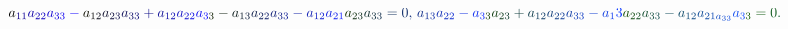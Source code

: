 \documentclass[12pt]{article}
\begin{document}
\begin{displaymath}
{a} _ { \mathcolor[RGB]{15,0,135}{1} \mathcolor[RGB]{15,0,150}{1} } \mathcolor[RGB]{15,0,165}{a} _ { \mathcolor[RGB]{15,0,180}{2} \mathcolor[RGB]{15,0,195}{2} } \mathcolor[RGB]{15,0,210}{a} _ { \mathcolor[RGB]{15,0,225}{3} \mathcolor[RGB]{15,0,240}{3} } \mathcolor[RGB]{15,0,255}{-} \mathcolor[RGB]{15,15,0}{a} _ { \mathcolor[RGB]{15,15,15}{1} \mathcolor[RGB]{15,15,30}{2} } \mathcolor[RGB]{15,15,45}{a} _ { \mathcolor[RGB]{15,15,60}{2} \mathcolor[RGB]{15,15,75}{3} } \mathcolor[RGB]{15,15,90}{a} _ { \mathcolor[RGB]{15,15,105}{3} \mathcolor[RGB]{15,15,120}{3} } \mathcolor[RGB]{15,15,135}{+} \mathcolor[RGB]{15,15,150}{a} _ { \mathcolor[RGB]{15,15,165}{1} \mathcolor[RGB]{15,15,180}{2} } \mathcolor[RGB]{15,15,195}{a} _ { \mathcolor[RGB]{15,15,210}{2} \mathcolor[RGB]{15,15,225}{2} } \mathcolor[RGB]{15,15,240}{a} _ { \mathcolor[RGB]{15,15,255}{3} \mathcolor[RGB]{15,30,0}{3} } \mathcolor[RGB]{15,30,15}{-} \mathcolor[RGB]{15,30,30}{a} _ { \mathcolor[RGB]{15,30,45}{1} \mathcolor[RGB]{15,30,60}{3} } \mathcolor[RGB]{15,30,75}{a} _ { \mathcolor[RGB]{15,30,90}{2} \mathcolor[RGB]{15,30,105}{2} } \mathcolor[RGB]{15,30,120}{a} _ { \mathcolor[RGB]{15,30,135}{3} \mathcolor[RGB]{15,30,150}{3} } \mathcolor[RGB]{15,30,165}{-} \mathcolor[RGB]{15,30,180}{a} _ { \mathcolor[RGB]{15,30,195}{1} \mathcolor[RGB]{15,30,210}{2} } \mathcolor[RGB]{15,30,225}{a} _ { \mathcolor[RGB]{15,30,240}{2} \mathcolor[RGB]{15,30,255}{1} } \mathcolor[RGB]{15,45,0}{a} _ { \mathcolor[RGB]{15,45,15}{2} \mathcolor[RGB]{15,45,30}{3} } \mathcolor[RGB]{15,45,45}{a} _ { \mathcolor[RGB]{15,45,60}{3} \mathcolor[RGB]{15,45,75}{3} } \mathcolor[RGB]{15,45,90}{=} \mathcolor[RGB]{15,45,105}{0} \mathcolor[RGB]{15,45,120}{,} \mathcolor[RGB]{15,45,135}{\,
a} _ { \mathcolor[RGB]{15,45,150}{1} \mathcolor[RGB]{15,45,165}{3} } \mathcolor[RGB]{15,45,180}{a} _ { \mathcolor[RGB]{15,45,195}{2} \mathcolor[RGB]{15,45,210}{2} } \mathcolor[RGB]{15,45,225}{-} \mathcolor[RGB]{15,45,240}{a} _ { \mathcolor[RGB]{15,45,255}{3} \mathcolor[RGB]{15,60,0}{3} } \mathcolor[RGB]{15,60,15}{a} _ { \mathcolor[RGB]{15,60,30}{2} \mathcolor[RGB]{15,60,45}{3} } \mathcolor[RGB]{15,60,60}{+} \mathcolor[RGB]{15,60,75}{a} _ { \mathcolor[RGB]{15,60,90}{1} \mathcolor[RGB]{15,60,105}{2} } \mathcolor[RGB]{15,60,120}{a} _ { \mathcolor[RGB]{15,60,135}{2} \mathcolor[RGB]{15,60,150}{2} } \mathcolor[RGB]{15,60,165}{a} _ { \mathcolor[RGB]{15,60,180}{3} \mathcolor[RGB]{15,60,195}{3} } \mathcolor[RGB]{15,60,210}{-} \mathcolor[RGB]{15,60,225}{a} _ { \mathcolor[RGB]{15,60,240}{1} } \mathcolor[RGB]{15,60,255}{3} \mathcolor[RGB]{15,75,0}{a} _ { \mathcolor[RGB]{15,75,15}{2} \mathcolor[RGB]{15,75,30}{2} } \mathcolor[RGB]{15,75,45}{a} _ { \mathcolor[RGB]{15,75,60}{3} \mathcolor[RGB]{15,75,75}{3} } \mathcolor[RGB]{15,75,90}{-} \mathcolor[RGB]{15,75,105}{a} _ { \mathcolor[RGB]{15,75,120}{1} \mathcolor[RGB]{15,75,135}{2} } \mathcolor[RGB]{15,75,150}{a} _ { \mathcolor[RGB]{15,75,165}{2} \mathcolor[RGB]{15,75,180}{1} \mathcolor[RGB]{15,75,195}{a} _ { \mathcolor[RGB]{15,75,210}{3} \mathcolor[RGB]{15,75,225}{3} } } \mathcolor[RGB]{15,75,240}{a} _ { \mathcolor[RGB]{15,75,255}{3} \mathcolor[RGB]{15,90,0}{3} } \mathcolor[RGB]{15,90,15}{=} \mathcolor[RGB]{15,90,30}{0} \mathcolor[RGB]{15,90,45}{.} \mathcolor[RGB]{15,90,60}{\,
}
\end{displaymath}
\end{document}
